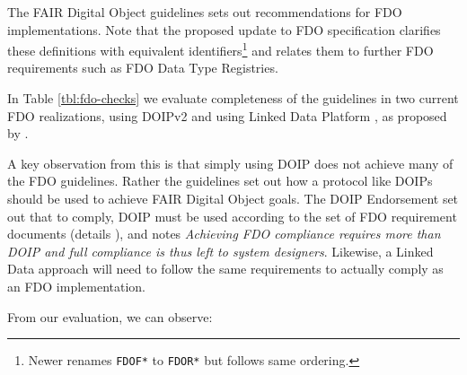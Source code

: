 \documentclass[fleqn,10pt,lineno]{wlpeerjlua}
\begin{document}
The FAIR Digital Object guidelines \autocite{boninoFAIRDigitalObject} sets out recommendations for FDO implementations. Note that the proposed update to FDO specification \autocite{fdo-RequirementSpec} clarifies these definitions with equivalent identifiers\footnote{Newer \autocite{fdo-RequirementSpec} renames \texttt{FDOF*} to \texttt{FDOR*} but follows same ordering.} and relates them to further FDO requirements such as FDO Data Type Registries.

In Table \vref{tbl:fdo-checks} we evaluate completeness of the guidelines in two current FDO realizations, using DOIPv2 \autocite{foundationDigitalObjectInterface} and using Linked Data Platform \autocite{w3-ldp}, as proposed by \textcite{FDOFramework}.

A key observation from this is that simply using DOIP does not achieve many of the FDO guidelines. Rather the guidelines set out how a protocol like DOIPs should be used to achieve FAIR Digital Object goals. The DOIP Endorsement \autocite{fdo-DOIPEndorsement} set out that to comply, DOIP must be used according to the set of FDO requirement documents (details ), and notes \emph{Achieving FDO compliance requires more than DOIP and full compliance is thus left to system designers}. Likewise, a Linked Data approach will need to follow the same requirements to actually comply as an FDO implementation.



From our evaluation, we can observe:
\end{document}
